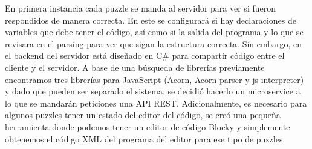 En primera instancia cada puzzle se manda al servidor para ver si fueron respondidos de manera correcta. En este se configurará si hay declaraciones de variables que debe tener el código, así como si la salida del programa y lo que se revisara en el parsing para ver que sigan la estructura correcta. Sin embargo, en el backend del servidor está diseñado en C\# para compartir código entre el cliente y el servidor. A base de una búsqueda de librerías previamente encontramos tres librerías para JavaScript (Acorn, Acorn-parser y js-interpreter) y dado que pueden ser separado el sistema, se decidió hacerlo un microservice a lo que se mandarán peticiones una API REST. Adicionalmente, es necesario para algunos puzzles tener un estado del editor del código, se creó una pequeña herramienta donde podemos tener un editor de código Blocky y simplemente obtenemos el código XML del programa del editor para ese tipo de puzzles.
